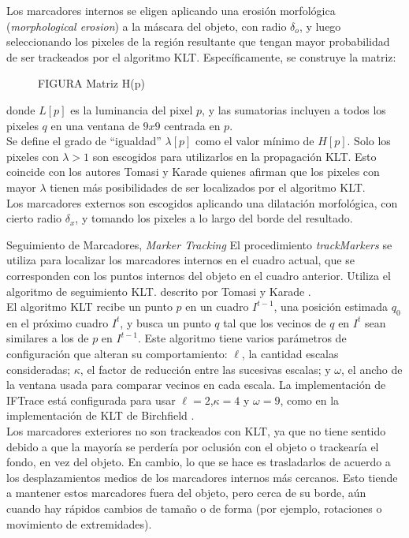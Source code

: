 \documentclass[a4paper,10pt]{article}
\begin{document}
Los marcadores internos se eligen aplicando una erosión morfológica 
(\textit{morphological erosion}) a la máscara del objeto, con radio $\delta_{o}$, y 
luego seleccionando los pixeles de la región resultante que tengan mayor probabilidad
de ser trackeados por el algoritmo KLT. Específicamente, se construye la matriz:

 \begin{figure}[H]
        \caption{FIGURA Matriz H(p)}
        \label{fig:IFTrace-matrix-H}
\end{figure}

donde $L[p]$ es la luminancia del pixel $p$, y las sumatorias incluyen a todos los
pixeles $q$ en una ventana de $9x9$ centrada en $p$.\\
Se define el grado de ``igualdad'' $\lambda[p]$ como el valor mínimo de $H[p]$. 
Solo los pixeles con $\lambda > 1$ son escogidos para utilizarlos en la 
propagación KLT. Esto coincide con los autores Tomasi y Karade \cite{Tomasi91detectionand}
quienes afirman que los pixeles con mayor $\lambda$ tienen más posibilidades
de ser localizados por el algoritmo KLT.\\
Los marcadores externos son escogidos aplicando una dilatación morfológica, con 
cierto radio $\delta_{x}$, y tomando los pixeles a lo largo del borde del resultado.

Seguimiento de Marcadores, \textit{Marker Tracking}
El procedimiento \textit{trackMarkers} se utiliza para localizar los marcadores 
internos en el cuadro actual, que se corresponden con los puntos internos del objeto
en el cuadro anterior. Utiliza el algoritmo de seguimiento KLT. descrito por Tomasi y 
Karade \cite{Tomasi91detectionand}.\\
El algoritmo KLT recibe un punto $p$ en un cuadro $I^{t-1}$, una posición estimada 
$q_{0}$ en el próximo cuadro $I^{t}$, y busca un punto $q$ tal que los vecinos
de $q$ en $I^{t}$ sean similares a los de $p$ en $I^{t-1}$. Este algoritmo tiene
varios parámetros de configuración que alteran su comportamiento: $\ell$, la cantidad
escalas consideradas; $\kappa$, el factor de reducción entre las sucesivas escalas; y 
$\omega$, el ancho de la ventana usada para comparar vecinos en cada escala. 
La implementación de IFTrace está configurada para usar $\ell=2$,$\kappa=4$ y 
$\omega=9$, como en la implementación de KLT de Birchfield \cite{Birchfield-KLT-implementation}.\\

Los marcadores exteriores no son trackeados con KLT, ya que no tiene sentido debido
a que la mayoría se perdería por oclusión con el objeto o trackearía el fondo, en 
vez del objeto. En cambio, lo que se hace es trasladarlos de acuerdo a los 
desplazamientos medios de los marcadores internos más cercanos. Esto tiende
a mantener estos marcadores fuera del objeto, pero cerca de su borde, aún cuando
hay rápidos cambios de tamaño o de forma (por ejemplo, rotaciones o movimiento de extremidades).\\
\end{document}
